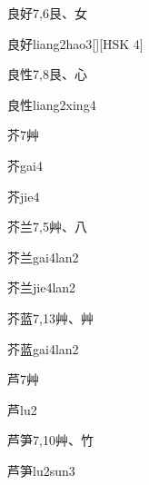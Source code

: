 \begin{Entry}{良好}{7,6}{⾉、⼥}
  \begin{Phonetics}{良好}{liang2hao3}[][HSK 4]
  \end{Phonetics}
\end{Entry}

\begin{Entry}{良性}{7,8}{⾉、⼼}
  \begin{Phonetics}{良性}{liang2xing4}
  \end{Phonetics}
\end{Entry}

\begin{Entry}{芥}{7}{⾋}
  \begin{Phonetics}{芥}{gai4}
  \end{Phonetics}
  \begin{Phonetics}{芥}{jie4}
  \end{Phonetics}
\end{Entry}

\begin{Entry}{芥兰}{7,5}{⾋、⼋}
  \begin{Phonetics}{芥兰}{gai4lan2}
  \end{Phonetics}
  \begin{Phonetics}{芥兰}{jie4lan2}
  \end{Phonetics}
\end{Entry}

\begin{Entry}{芥蓝}{7,13}{⾋、⾋}
  \begin{Phonetics}{芥蓝}{gai4lan2}
  \end{Phonetics}
\end{Entry}

\begin{Entry}{芦}{7}{⾋}
  \begin{Phonetics}{芦}{lu2}
  \end{Phonetics}
\end{Entry}

\begin{Entry}{芦笋}{7,10}{⾋、⽵}
  \begin{Phonetics}{芦笋}{lu2sun3}
  \end{Phonetics}
\end{Entry}

